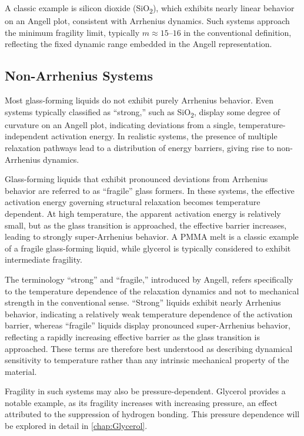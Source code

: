 A classic example is silicon dioxide (SiO\textsubscript{2}), which exhibits nearly linear behavior on an Angell plot, consistent with Arrhenius dynamics. Such systems approach the minimum fragility limit, typically $m \approx 15$--$16$ in the conventional definition, reflecting the fixed dynamic range embedded in the Angell representation. 

\subsection{Non-Arrhenius Systems}

Most glass-forming liquids do not exhibit purely Arrhenius behavior. Even systems typically classified as ``strong,'' such as SiO\textsubscript{2}, display some degree of curvature on an Angell plot, indicating deviations from a single, temperature-independent activation energy. In realistic systems, the presence of multiple relaxation pathways lead to a distribution of energy barriers, giving rise to non-Arrhenius dynamics.

Glass-forming liquids that exhibit pronounced deviations from Arrhenius behavior are referred to as ``fragile'' glass formers. In these systems, the effective activation energy governing structural relaxation becomes temperature dependent. At high temperature, the apparent activation energy is relatively small, but as the glass transition is approached, the effective barrier increases, leading to strongly super-Arrhenius behavior. A PMMA melt is a classic example of a fragile glass-forming liquid, while glycerol is typically considered to exhibit intermediate fragility.

The terminology ``strong'' and ``fragile,'' introduced by Angell, refers specifically to the temperature dependence of the relaxation dynamics and not to mechanical strength in the conventional sense. ``Strong'' liquids exhibit nearly Arrhenius behavior, indicating a relatively weak temperature dependence of the activation barrier, whereas ``fragile'' liquids display pronounced super-Arrhenius behavior, reflecting a rapidly increasing effective barrier as the glass transition is approached. These terms are therefore best understood as describing dynamical sensitivity to temperature rather than any intrinsic mechanical property of the material.

Fragility in such systems may also be pressure-dependent. Glycerol provides a notable example, as its fragility increases with increasing pressure, an effect attributed to the suppression of hydrogen bonding. This pressure dependence will be explored in detail in \chap\nolinebreak\ref{chap:Glycerol}.

